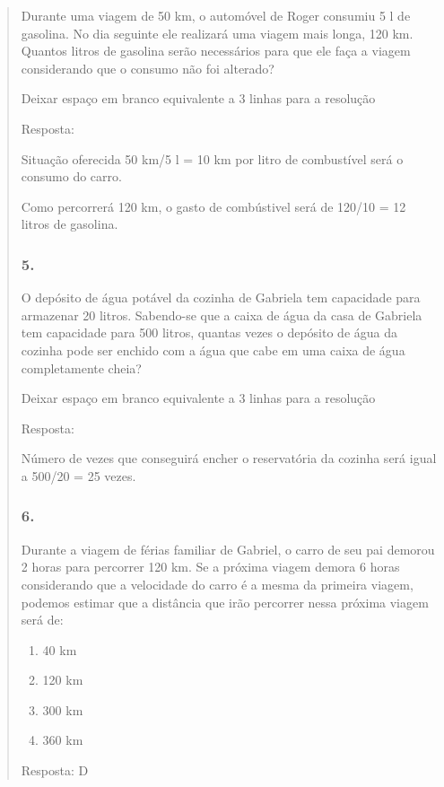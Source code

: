 \begin{enumerate}
\begin{escolha}
\begin{enumerate}
\begin{itemize}
\begin{itemize}
\begin{escolha}
\begin{quote}
\begin{escolha}
{Durante uma viagem de 50 km, o automóvel de Roger consumiu 5 l de
gasolina. No dia seguinte ele realizará uma viagem mais longa, 120 km.
Quantos litros de gasolina serão necessários para que ele faça a viagem
considerando que o consumo não foi alterado?

Deixar espaço em branco equivalente a 3 linhas para a resolução

Resposta:

Situação oferecida 50 km/5 l = 10 km por litro de combustível será o
consumo do carro.

Como percorrerá 120 km, o gasto de combústivel será de 120/10 = 12
litros de gasolina.

\subsubsection{5.}\label{section-121}

O depósito de água potável da cozinha de Gabriela tem capacidade para
armazenar 20 litros. Sabendo-se que a caixa de água da casa de Gabriela
tem capacidade para 500 litros, quantas vezes o depósito de água da
cozinha pode ser enchido com a água que cabe em uma caixa de água
completamente cheia?

Deixar espaço em branco equivalente a 3 linhas para a resolução

Resposta:

Número de vezes que conseguirá encher o reservatória da cozinha será
igual a 500/20 = 25 vezes.

\subsubsection{6.}\label{section-122}

Durante a viagem de férias familiar de Gabriel, o carro de seu pai
demorou 2 horas para percorrer 120 km. Se a próxima viagem demora 6
horas considerando que a velocidade do carro é a mesma da primeira
viagem, podemos estimar que a distância que irão percorrer nessa próxima
viagem será de:

\begin{enumerate}
\def\labelenumi{\alph{enumi})}
\item
  40 km
\item
  120 km
\item
  300 km
\item
  360 km
\end{enumerate}

Resposta: D

}
\end{escolha}
\end{quote}
\end{escolha}
\end{itemize}
\end{itemize}
\end{enumerate}
\end{escolha}
\end{enumerate}
